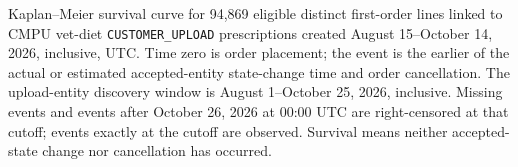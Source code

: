 Kaplan--Meier survival curve for 94,869 eligible distinct
first-order lines linked to CMPU vet-diet \texttt{CUSTOMER\_UPLOAD} prescriptions
created August 15--October 14, 2026, inclusive, UTC. Time zero is order placement;
the event is the earlier of the actual or estimated accepted-entity state-change
time and order cancellation. The upload-entity discovery window is August
1--October 25, 2026, inclusive. Missing events and events after October 26, 2026
at 00:00 UTC are right-censored at that cutoff; events exactly at the cutoff
are observed. Survival means neither accepted-state change nor
cancellation has occurred.
